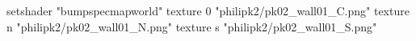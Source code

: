 setshader "bumpspecmapworld"
    texture 0 "philipk2/pk02_wall01_C.png"
    texture n "philipk2/pk02_wall01_N.png"
    texture s "philipk2/pk02_wall01_S.png"